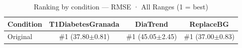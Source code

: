 \begin{table}[htbp]
\centering
\small
\caption{Ranking by condition — RMSE · All Ranges  (1 = best)}
\label{tab:ranking_rmse_entire_family_size_baseline}
\begin{tabular}{lccc}
\toprule
\textbf{Condition} & \textbf{T1DiabetesGranada} & \textbf{DiaTrend} & \textbf{ReplaceBG} \\
\midrule
Original & \#1 (37.80$\pm$0.81) & \#1 (45.05$\pm$2.45) & \#1 (37.00$\pm$0.83) \\
\bottomrule
\end{tabular}
\end{table}